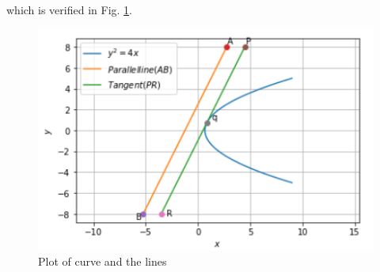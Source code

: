 which is verified in Fig. \ref{quadform/82/Plot of curve and the lines}.
%
\begin{figure}[ht]
\centering
\includegraphics[width=\columnwidth]{solutions/su2021/2/82/Parabola.PNG}
\caption{Plot of curve and the lines}
\label{quadform/82/Plot of curve and the lines}
\end{figure}